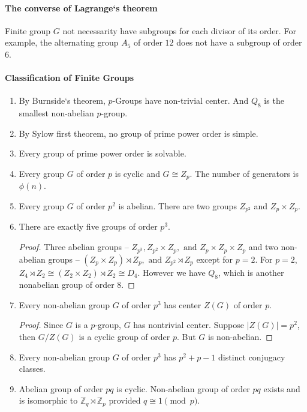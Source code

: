 \paragraph{The converse of Lagrange`s theorem} Finite group $G$ not necessarity have subgroups for each divisor of its order.
	For example, the alternating group $A_5$ of order $12$ does not have a subgroup of order $6$.

\paragraph{Classification of Finite Groups}
\begin{enumerate}
	\item By Burnside`s theorem, $p$-Groups have non-trivial center. And $Q_8$ is the smallest non-abelian $p$-group.
	\item By Sylow first theorem, no group of prime power order is simple.
	\item Every group of prime power order is solvable.
	\item Every group $G$ of order $p$ is cyclic and $G \cong Z_p$. The number of generators is $\phi(n)$.
	\item Every group $G$ of order $p^2$ is abelian. There are two groups $Z_{p^2}$ and $Z_p \times Z_p$.
	\item There are exactly five groups of order $p^3$.
	\begin{proof}
		Three abelian groups -- $Z_{p^3}, Z_{p^2} \times Z_p, \text{ and } Z_p \times Z_p \times Z_p$ and two non-abelian groups -- $(Z_p \times Z_p) \rtimes Z_p, \text{ and } Z_{p^2} \rtimes Z_p$ except for $p =2$. For $p=2$, $Z_4 \rtimes Z_2 \cong (Z_2 \times Z_2) \rtimes Z_2 \cong D_4$. However we have $Q_8$, which is another nonabelian group of order $8$.
	\end{proof}
	\item Every non-abelian group $G$ of order $p^3$ has center $Z(G)$ of order $p$.
	\begin{proof}
		Since $G$ is a $p$-group, $G$ has nontrivial center. Suppose $|Z(G)| = p^2$, then $G/Z(G)$ is a cyclic group of order $p$. But $G$ is non-abelian.
	\end{proof}
	\item Every non-abelian group $G$ of order $p^3$ has $p^2+p-1$ distinct conjugacy classes.
	\item Abelian group of order $pq$ is cyclic. Non-abelian group of order $pq$ exists and is isomorphic to $\mathbb{Z}_q \rtimes \mathbb{Z}_p$ provided $q \cong 1 \pmod{p}$.

\end{enumerate}
